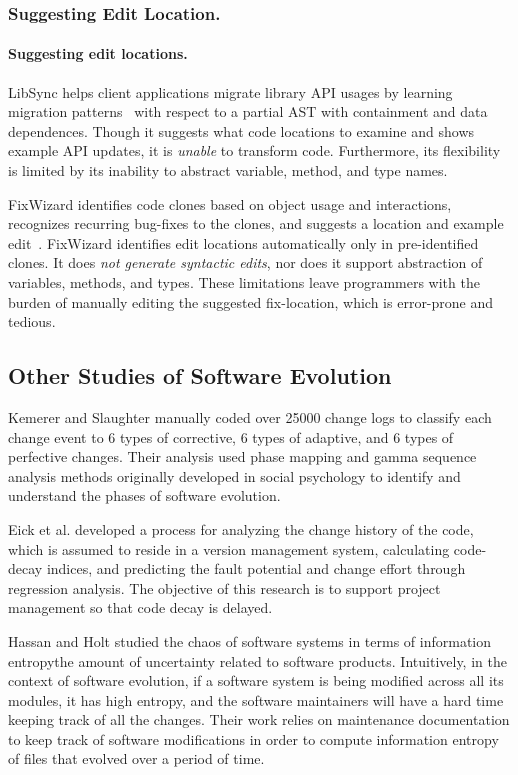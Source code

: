 \documentclass[runningheads,a4paper]{llncs}
\begin{document}
\subsubsection{Suggesting Edit Location.}


\paragraph*{Suggesting edit locations.}
LibSync helps client applications migrate library API usages by learning migration patterns~\cite{Nguyen2010:libsync} with respect to a partial AST with containment and data dependences. Though it suggests what code locations to examine and shows example API updates, it is \emph{unable} to transform code.  Furthermore, its flexibility is limited by its inability to abstract variable, method, and type names.

FixWizard identifies code clones based on object usage and interactions, recognizes recurring bug-fixes to the clones, and suggests a location and example edit~\cite{Nguyen2010:fixwizard}. FixWizard identifies edit locations automatically only in pre-identified clones.  It does {\em not generate syntactic edits}, nor does it support abstraction of variables, methods, and types. These limitations leave programmers with the burden of manually editing the suggested fix-location, which is error-prone and tedious.

\subsection{Other Studies of Software Evolution} 
Kemerer and Slaughter \cite{Kemerer1999} manually coded over 25000 change logs to classify each change event to 6 types of corrective, 6 types of adaptive, and 6 types of perfective changes. Their analysis used phase mapping and gamma sequence analysis methods originally developed in social psychology to identify and understand the phases of software evolution. 

Eick et al. \cite{Eick2001} developed a process for analyzing the change history of the code, which is assumed to reside in a version management system, calculating code-decay indices, and predicting the fault potential and change effort through regression analysis. The objective of this research is to support project management so that code decay is delayed. 

Hassan and Holt \cite{Hassan2003} studied the chaos of software systems in terms of information entropy\textemdash the amount of uncertainty related to software products. Intuitively, in the context of software evolution, if a software system is being modified across all its modules, it has high entropy, and the software maintainers will have a hard time keeping track of all the changes. Their work relies on maintenance documentation to keep track of software modifications in order to compute information entropy of files that evolved over a period of time. 
\end{document}
